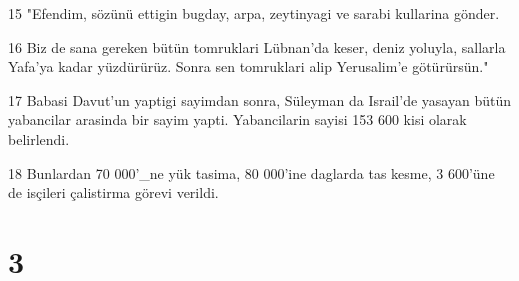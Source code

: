 \par 15 "Efendim, sözünü ettigin bugday, arpa, zeytinyagi ve sarabi kullarina gönder.
\par 16 Biz de sana gereken bütün tomruklari Lübnan'da keser, deniz yoluyla, sallarla Yafa'ya kadar yüzdürürüz. Sonra sen tomruklari alip Yerusalim'e götürürsün."
\par 17 Babasi Davut'un yaptigi sayimdan sonra, Süleyman da Israil'de yasayan bütün yabancilar arasinda bir sayim yapti. Yabancilarin sayisi 153 600 kisi olarak belirlendi.
\par 18 Bunlardan 70 000'_ne yük tasima, 80 000'ine daglarda tas kesme, 3 600'üne de isçileri çalistirma görevi verildi.

\chapter{3}

